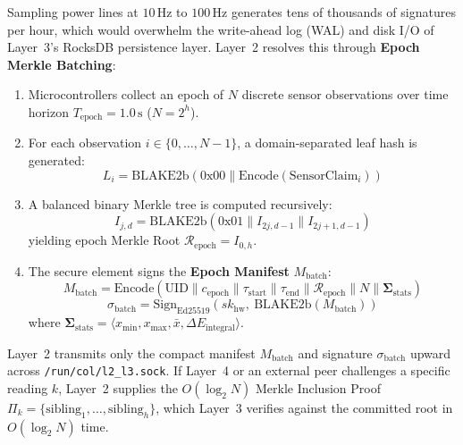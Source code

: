 Sampling power lines at $10\,\mathrm{Hz}$ to $100\,\mathrm{Hz}$ generates tens of thousands of signatures per hour, which would overwhelm the write-ahead log (WAL) and disk I/O of Layer~3's RocksDB persistence layer. Layer~2 resolves this through \textbf{Epoch Merkle Batching}:
\begin{enumerate}
    \item Microcontrollers collect an epoch of $N$ discrete sensor observations over time horizon $T_{\mathrm{epoch}} = 1.0\,\mathrm{s}$ ($N = 2^h$).
    \item For each observation $i \in \{0, \dots, N-1\}$, a domain-separated leaf hash is generated:
    \begin{equation}
    L_i = \mathrm{BLAKE2b}\left(0\mathrm{x}00 \parallel \mathrm{Encode}(\mathrm{SensorClaim}_i)\right)
    \label{eq:l2_merkle_leaf}
    \end{equation}
    \item A balanced binary Merkle tree is computed recursively:
    \begin{equation}
    I_{j, d} = \mathrm{BLAKE2b}\left(0\mathrm{x}01 \parallel I_{2j, d-1} \parallel I_{2j+1, d-1}\right)
    \label{eq:l2_merkle_node}
    \end{equation}
    yielding epoch Merkle Root $\mathcal{R}_{\mathrm{epoch}} = I_{0, h}$.
    \item The secure element signs the \textbf{Epoch Manifest} $M_{\mathrm{batch}}$:
    \begin{equation}
    M_{\mathrm{batch}} = \mathrm{Encode}\left(\mathrm{UID} \parallel c_{\mathrm{epoch}} \parallel \tau_{\mathrm{start}} \parallel \tau_{\mathrm{end}} \parallel \mathcal{R}_{\mathrm{epoch}} \parallel N \parallel \mathbf{\Sigma}_{\mathrm{stats}}\right)
    \label{eq:l2_epoch_manifest}
    \end{equation}
    \begin{equation}
    \sigma_{\mathrm{batch}} = \mathrm{Sign}_{\mathrm{Ed25519}}\left(sk_{\mathrm{hw}}, \ \mathrm{BLAKE2b}(M_{\mathrm{batch}})\right)
    \label{eq:l2_epoch_signature}
    \end{equation}
    where $\mathbf{\Sigma}_{\mathrm{stats}} = \langle x_{\min}, x_{\max}, \bar{x}, \Delta E_{\mathrm{integral}} \rangle$.
\end{enumerate}

Layer~2 transmits only the compact manifest $M_{\mathrm{batch}}$ and signature $\sigma_{\mathrm{batch}}$ upward across \texttt{/run/col/l2\_l3.sock}. If Layer~4 or an external peer challenges a specific reading $k$, Layer~2 supplies the $O(\log_2 N)$ Merkle Inclusion Proof $\Pi_k = \{\mathrm{sibling}_1, \dots, \mathrm{sibling}_h\}$, which Layer~3 verifies against the committed root in $O(\log_2 N)$ time.

